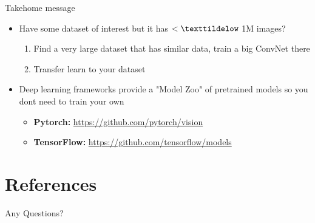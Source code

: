 \documentclass[serif, aspectratio=169]{beamer}
\begin{document}
\begin{frame}{Takehome message}
	\begin{itemize}
		\item Have some dataset of interest but it has $< \texttildelow$ 1M images?
		\begin{enumerate}
			\item Find a very large dataset that has similar data, train a big ConvNet there
			\item Transfer learn to your dataset
		\end{enumerate}
		\item Deep learning frameworks provide a "Model Zoo" of pretrained models so you dont need to train your own
		\begin{itemize}
			\item \textbf{Pytorch:} \href{https://github.com/pytorch/vision}{\color{blue} https://github.com/pytorch/vision}
			\item \textbf{TensorFlow:} \href{https://github.com/tensorflow/models}{\color{blue} https://github.com/tensorflow/models}
		\end{itemize}

	\end{itemize}
\end{frame}

\section{References}

\begin{frame}[allowframebreaks]
	
	
	\nocite{*} %
\end{frame}


\begin{frame}
	\begin{center}
		{\Huge Any Questions?}
	\end{center}
\end{frame}
\end{document}
